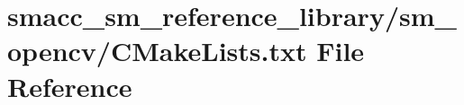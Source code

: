 \hypertarget{sm__reference__library_2sm__opencv_2CMakeLists_8txt}{}\section{smacc\+\_\+sm\+\_\+reference\+\_\+library/sm\+\_\+opencv/\+C\+Make\+Lists.txt File Reference}
\label{sm__reference__library_2sm__opencv_2CMakeLists_8txt}
